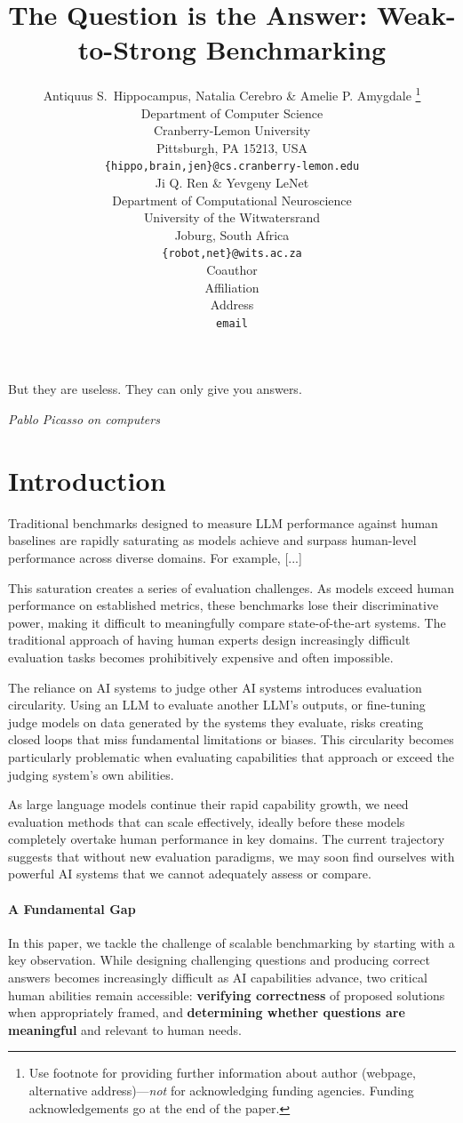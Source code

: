 \documentclass{article} %
\title{The Question is the Answer: Weak-to-Strong Benchmarking}
\author{Antiquus S.~Hippocampus, Natalia Cerebro \& Amelie P. Amygdale \thanks{ Use footnote for providing further information
about author (webpage, alternative address)---\emph{not} for acknowledging
funding agencies.  Funding acknowledgements go at the end of the paper.} \\
Department of Computer Science\\
Cranberry-Lemon University\\
Pittsburgh, PA 15213, USA \\
\texttt{\{hippo,brain,jen\}@cs.cranberry-lemon.edu} \\
\And
Ji Q. Ren \& Yevgeny LeNet \\
Department of Computational Neuroscience \\
University of the Witwatersrand \\
Joburg, South Africa \\
\texttt{\{robot,net\}@wits.ac.za} \\
\AND
Coauthor \\
Affiliation \\
Address \\
\texttt{email}
}
\begin{document}
\maketitle

\epigraph{But they are useless. They can only give you answers.}{\textit{Pablo Picasso on computers}}

\section{Introduction}

Traditional benchmarks designed to measure LLM performance against human baselines are rapidly saturating as models achieve and surpass human-level performance across diverse domains. For example, [...]

This saturation creates a series of evaluation challenges. As models exceed human performance on established metrics, these benchmarks lose their discriminative power, making it difficult to meaningfully compare state-of-the-art systems. The traditional approach of having human experts design increasingly difficult evaluation tasks becomes prohibitively expensive and often impossible.

The reliance on AI systems to judge other AI systems introduces evaluation circularity. Using an LLM to evaluate another LLM's outputs, or fine-tuning judge models on data generated by the systems they evaluate, risks creating closed loops that miss fundamental limitations or biases.
This circularity becomes particularly problematic when evaluating capabilities that approach or exceed the judging system's own abilities.

As large language models continue their rapid capability growth, we need evaluation methods that can scale effectively, ideally before these models completely overtake human performance in key domains. The current trajectory suggests that without new evaluation paradigms, we may soon find ourselves with powerful AI systems that we cannot adequately assess or compare.


\paragraph{A Fundamental Gap} In this paper, we tackle the challenge of scalable benchmarking by starting with a key observation. While designing challenging questions and producing correct answers becomes increasingly difficult as AI capabilities advance, two critical human abilities remain accessible: \textbf{verifying correctness} of proposed solutions when appropriately framed, and \textbf{determining whether questions are meaningful} and relevant to human needs.
\end{document}
